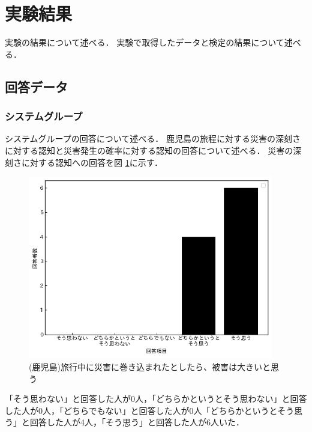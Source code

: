 \section{実験結果}
実験の結果について述べる．
実験で取得したデータと検定の結果について述べる．

\subsection{回答データ}
\subsubsection{システムグループ}
システムグループの回答について述べる．
鹿児島の旅程に対する災害の深刻さに対する認知と災害発生の確率に対する認知の回答について述べる．
災害の深刻さに対する認知への回答を図 \ref{fig:system_kagoshima_1}に示す．
\begin{figure}[H]
  \centering
  \includegraphics[height=8cm]{./fig/system_kagoshima_1.png}
  \caption{(鹿児島)旅行中に災害に巻き込まれたとしたら、被害は大きいと思う}
  \label{fig:system_kagoshima_1}
\end{figure}
「そう思わない」と回答した人が0人，「どちらかというとそう思わない」と回答した人が0人，「どちらでもない」と回答した人が0人「どちらかというとそう思う」と回答した人が4人，「そう思う」と回答した人が6人いた．

